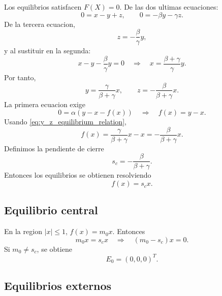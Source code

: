 \documentclass[11pt]{article}
\begin{document}
Los equilibrios satisfacen \(F(X)=0\). De las dos ultimas ecuaciones:
\[
0=x-y+z,\qquad 0=-\beta y-\gamma z.
\]
De la tercera ecuacion,
\[
z=-\frac{\beta}{\gamma}y,
\]
y al sustituir en la segunda:
\[
x-y-\frac{\beta}{\gamma}y=0
\quad\Longrightarrow\quad
x=\frac{\beta+\gamma}{\gamma}y.
\]
Por tanto,
\begin{equation}
\label{eq:y_z_equilibrium_relation}
y=\frac{\gamma}{\beta+\gamma}x,
\qquad
z=-\frac{\beta}{\beta+\gamma}x.
\end{equation}
La primera ecuacion exige
\[
0=\alpha(y-x-f(x))
\quad\Longrightarrow\quad
f(x)=y-x.
\]
Usando \eqref{eq:y_z_equilibrium_relation},
\[
f(x)=\frac{\gamma}{\beta+\gamma}x-x
=-\frac{\beta}{\beta+\gamma}x.
\]
Definimos la pendiente de cierre
\begin{equation}
\label{eq:closing_slope}
s_c=-\frac{\beta}{\beta+\gamma}.
\end{equation}
Entonces los equilibrios se obtienen resolviendo
\begin{equation}
\label{eq:equilibrium_scalar_condition}
f(x)=s_cx.
\end{equation}

\subsection{Equilibrio central}

En la region \(|x|\leq 1\), \(f(x)=m_0x\). Entonces
\[
m_0x=s_cx
\quad\Longrightarrow\quad
(m_0-s_c)x=0.
\]
Si \(m_0\neq s_c\), se obtiene
\begin{equation}
\label{eq:E0}
E_0=(0,0,0)^T.
\end{equation}

\subsection{Equilibrios externos}
\end{document}
